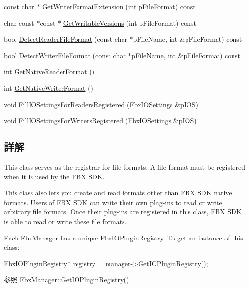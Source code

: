 \begin{DoxyCompactItemize}
\item 
const char $\ast$ \hyperlink{class_fbx_i_o_plugin_registry_abe5b3d6fef71707f13e4a1ded04a2285}{Get\+Writer\+Format\+Extension} (int p\+File\+Format) const
\item 
char const  $\ast$const  $\ast$ \hyperlink{class_fbx_i_o_plugin_registry_a37b01e6dc7991d69eb26dbfbd6e25e61}{Get\+Writable\+Versions} (int p\+File\+Format) const
\item 
bool \hyperlink{class_fbx_i_o_plugin_registry_ae5fe6282bafb2d5dca00b39ad97ee0e7}{Detect\+Reader\+File\+Format} (const char $\ast$p\+File\+Name, int \&p\+File\+Format) const
\item 
bool \hyperlink{class_fbx_i_o_plugin_registry_adcb5757258905fc61f574b877aa55b54}{Detect\+Writer\+File\+Format} (const char $\ast$p\+File\+Name, int \&p\+File\+Format) const
\item 
int \hyperlink{class_fbx_i_o_plugin_registry_a327774f480239422e9fb51a15eee99ce}{Get\+Native\+Reader\+Format} ()
\item 
int \hyperlink{class_fbx_i_o_plugin_registry_a846db4ae58c80f28d8fd48c6af93ea3e}{Get\+Native\+Writer\+Format} ()
\item 
void \hyperlink{class_fbx_i_o_plugin_registry_a92c7a20e1eb9948e83c4915c47fd63dc}{Fill\+I\+O\+Settings\+For\+Readers\+Registered} (\hyperlink{class_fbx_i_o_settings}{Fbx\+I\+O\+Settings} \&p\+I\+OS)
\item 
void \hyperlink{class_fbx_i_o_plugin_registry_adbb47a3ba26c90c49988f11cd30b21d8}{Fill\+I\+O\+Settings\+For\+Writers\+Registered} (\hyperlink{class_fbx_i_o_settings}{Fbx\+I\+O\+Settings} \&p\+I\+OS)
\end{DoxyCompactItemize}


\subsection{詳解}
This class serves as the registrar for file formats. A file format must be registered when it is used by the F\+BX S\+DK. 

This class also lets you create and read formats other than F\+BX S\+DK native formats. Users of F\+BX S\+DK can write their own plug-\/ins to read or write arbitrary file formats. Once their plug-\/ins are registered in this class, F\+BX S\+DK is able to read or write these file formats.

Each \hyperlink{class_fbx_manager}{Fbx\+Manager} has a unique \hyperlink{class_fbx_i_o_plugin_registry}{Fbx\+I\+O\+Plugin\+Registry}. To get an instance of this class\+: 
\begin{DoxyCode}
\hyperlink{class_fbx_i_o_plugin_registry}{FbxIOPluginRegistry}* registry = manager->GetIOPluginRegistry();
\end{DoxyCode}
 \begin{DoxySeeAlso}{参照}
\hyperlink{class_fbx_manager_ae6cc5dd81a15ec63c7c8102d349231d8}{Fbx\+Manager\+::\+Get\+I\+O\+Plugin\+Registry()} 
\end{DoxySeeAlso}


